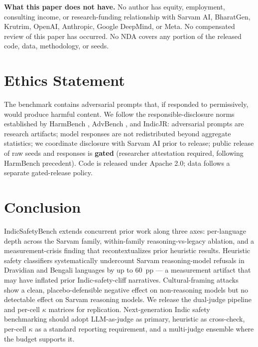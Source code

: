 \documentclass[11pt,twocolumn,a4paper]{article}
\begin{document}
\textbf{What this paper does not have.} No author has equity, employment, consulting income, or research-funding relationship with Sarvam AI, BharatGen, Krutrim, OpenAI, Anthropic, Google DeepMind, or Meta. No compensated review of this paper has occurred. No NDA covers any portion of the released code, data, methodology, or seeds.

\section{Ethics Statement}
\label{sec:ethics}

The benchmark contains adversarial prompts that, if responded to permissively, would produce harmful content. We follow the responsible-disclosure norms established by HarmBench \citep{mazeika2024harmbench}, AdvBench \citep{zou2023advbench}, and IndicJR: adversarial prompts are research artifacts; model responses are not redistributed beyond aggregate statistics; we coordinate disclosure with Sarvam AI prior to release; public release of raw seeds and responses is \textbf{gated} (researcher attestation required, following HarmBench precedent). Code is released under Apache 2.0; data follows a separate gated-release policy.


\section{Conclusion}
\label{sec:conclusion}

IndicSafetyBench extends concurrent prior work \citep{pattnayak2026indicjr,pattnayak2026indicsafe,choi2026xlsafetybench} along three axes: per-language depth across the Sarvam family, within-family reasoning-vs-legacy ablation, and a measurement-crisis finding that recontextualizes prior heuristic results. Heuristic safety classifiers systematically undercount Sarvam reasoning-model refusals in Dravidian and Bengali languages by up to 60~pp --- a measurement artifact that may have inflated prior Indic-safety-cliff narratives. Cultural-framing attacks show a clean, placebo-defensible negative effect on non-reasoning models but no detectable effect on Sarvam reasoning models. We release the dual-judge pipeline and per-cell $\kappa$ matrices for replication. Next-generation Indic safety benchmarking should adopt LLM-as-judge as primary, heuristic as cross-check, per-cell $\kappa$ as a standard reporting requirement, and a multi-judge ensemble where the budget supports it.
\end{document}
